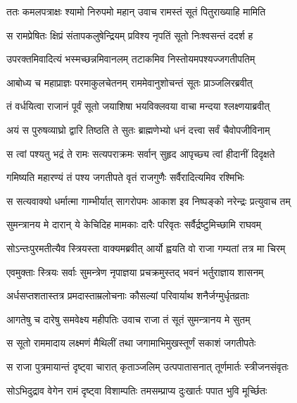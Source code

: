 
\twolineshloka
{ततः कमलपत्राक्षः श्यामो निरुपमो महान्}
{उवाच रामस्तं सूतं पितुराख्याहि मामिति} %

\twolineshloka
{स रामप्रेषितः क्षिप्रं संतापकलुषेन्द्रियम्}
{प्रविश्य नृपतिं सूतो निःश्वसन्तं ददर्श ह} %

\twolineshloka
{उपरक्तमिवादित्यं भस्मच्छन्नमिवानलम्}
{तटाकमिव निस्तोयमपश्यज्जगतीपतिम्} %

\twolineshloka
{आबोध्य च महाप्राज्ञः परमाकुलचेतनम्}
{राममेवानुशोचन्तं सूतः प्राञ्जलिरब्रवीत्} %

\twolineshloka
{तं वर्धयित्वा राजानं पूर्वं सूतो जयाशिषा}
{भयविक्लवया वाचा मन्दया श्लक्ष्णयाब्रवीत्} %

\twolineshloka
{अयं स पुरुषव्याघ्रो द्वारि तिष्ठति ते सुतः}
{ब्राह्मणेभ्यो धनं दत्त्वा सर्वं चैवोपजीविनाम्} %

\twolineshloka
{स त्वां पश्यतु भद्रं ते रामः सत्यपराक्रमः}
{सर्वान् सुहृद आपृच्छ्य त्वां हीदानीं दिदृक्षते} %

\twolineshloka
{गमिष्यति महारण्यं तं पश्य जगतीपते}
{वृतं राजगुणैः सर्वैरादित्यमिव रश्मिभिः} %

\twolineshloka
{स सत्यवाक्यो धर्मात्मा गाम्भीर्यात् सागरोपमः}
{आकाश इव निष्पङ्को नरेन्द्रः प्रत्युवाच तम्} %

\twolineshloka
{सुमन्त्रानय मे दारान् ये केचिदिह मामकाः}
{दारैः परिवृतः सर्वैर्द्रष्टुमिच्छामि राघवम्} %

\twolineshloka
{सोऽन्तःपुरमतीत्यैव स्त्रियस्ता वाक्यमब्रवीत्}
{आर्यो ह्वयति वो राजा गम्यतां तत्र मा चिरम्} %

\twolineshloka
{एवमुक्ताः स्त्रियः सर्वाः सुमन्त्रेण नृपाज्ञया}
{प्रचक्रमुस्तद् भवनं भर्तुराज्ञाय शासनम्} %

\twolineshloka
{अर्धसप्तशतास्तत्र प्रमदास्ताम्रलोचनाः}
{कौसल्यां परिवार्याथ शनैर्जग्मुर्धृतव्रताः} %

\twolineshloka
{आगतेषु च दारेषु समवेक्ष्य महीपतिः}
{उवाच राजा तं सूतं सुमन्त्रानय मे सुतम्} %

\twolineshloka
{स सूतो राममादाय लक्ष्मणं मैथिलीं तथा}
{जगामाभिमुखस्तूर्णं सकाशं जगतीपतेः} %

\twolineshloka
{स राजा पुत्रमायान्तं दृष्ट्वा चारात् कृताञ्जलिम्}
{उत्पपातासनात् तूर्णमार्तः स्त्रीजनसंवृतः} %

\twolineshloka
{सोऽभिदुद्राव वेगेन रामं दृष्ट्वा विशाम्पतिः}
{तमसम्प्राप्य दुःखार्तः पपात भुवि मूर्च्छितः} %

